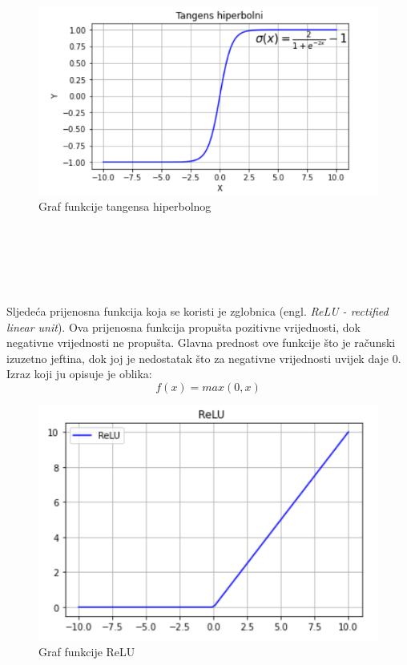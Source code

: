 \documentclass[times, utf8, zavrsni, numeric]{fer}
\begin{document}
\begin{figure}[htb]
\centering
\includegraphics[scale=0.6]{img/slika7.png}
\caption{Graf funkcije tangensa hiperbolnog}
\label{fig:Perceptron}
\end{figure}\\
\\\\\\\\
Sljedeća prijenosna funkcija koja se koristi je zglobnica (engl. \textit{ReLU - rectified linear unit}). Ova prijenosna funkcija propušta pozitivne vrijednosti, dok negativne vrijednosti ne propušta. Glavna prednost ove funkcije što je računski izuzetno jeftina, dok joj je nedostatak što za negativne vrijednosti uvijek daje 0. Izraz koji ju opisuje je oblika:
\begin{equation}
f(x)=max(0,x)
\label{eq:Aktivacija}
\end{equation}
\begin{figure}[htb]
\centering
\includegraphics[scale=0.6]{img/slika8.png}
\caption{Graf funkcije ReLU}
\label{fig:Perceptron}
\end{figure}
\end{document}
